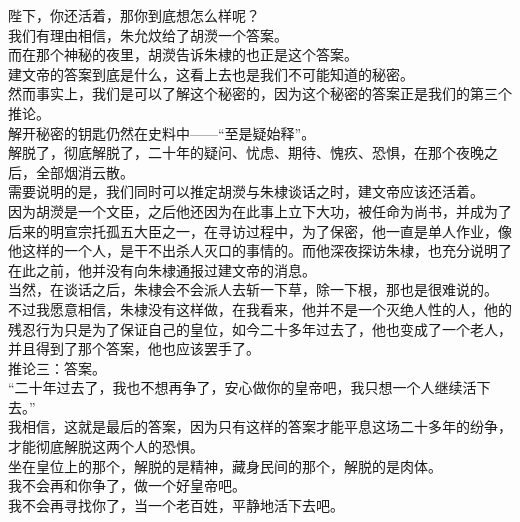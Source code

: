 \begin{multicols}{\theparacolNo}
陛下，你还活着，那你到底想怎么样呢？\\

我们有理由相信，朱允炆给了胡濙一个答案。\\

而在那个神秘的夜里，胡濙告诉朱棣的也正是这个答案。\\

建文帝的答案到底是什么，这看上去也是我们不可能知道的秘密。\\

然而事实上，我们是可以了解这个秘密的，因为这个秘密的答案正是我们的第三个推论。\\

解开秘密的钥匙仍然在史料中——“至是疑始释”。\\

解脱了，彻底解脱了，二十年的疑问、忧虑、期待、愧疚、恐惧，在那个夜晚之后，全部烟消云散。\\

需要说明的是，我们同时可以推定胡濙与朱棣谈话之时，建文帝应该还活着。\\

因为胡濙是一个文臣，之后他还因为在此事上立下大功，被任命为尚书，并成为了后来的明宣宗托孤五大臣之一，在寻访过程中，为了保密，他一直是单人作业，像他这样的一个人，是干不出杀人灭口的事情的。而他深夜探访朱棣，也充分说明了在此之前，他并没有向朱棣通报过建文帝的消息。\\

当然，在谈话之后，朱棣会不会派人去斩一下草，除一下根，那也是很难说的。\\

不过我愿意相信，朱棣没有这样做，在我看来，他并不是一个灭绝人性的人，他的残忍行为只是为了保证自己的皇位，如今二十多年过去了，他也变成了一个老人，并且得到了那个答案，他也应该罢手了。\\

推论三：答案。\\

“二十年过去了，我也不想再争了，安心做你的皇帝吧，我只想一个人继续活下去。”\\

我相信，这就是最后的答案，因为只有这样的答案才能平息这场二十多年的纷争，才能彻底解脱这两个人的恐惧。\\

坐在皇位上的那个，解脱的是精神，藏身民间的那个，解脱的是肉体。\\

我不会再和你争了，做一个好皇帝吧。\\

我不会再寻找你了，当一个老百姓，平静地活下去吧。\\


\end{multicols}
